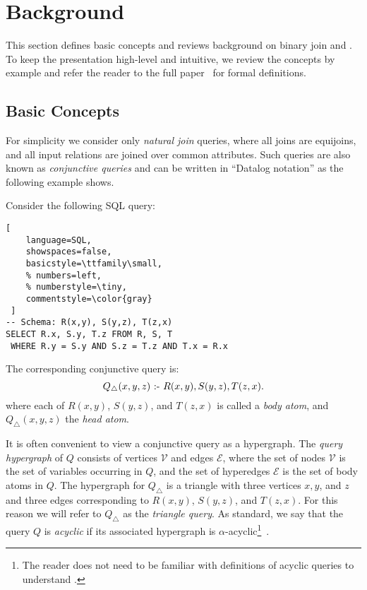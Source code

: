 \section{Background}\label{sec:background}

This section defines basic concepts and reviews background on binary
join and \GJ.
To keep the presentation high-level and intuitive,
we review the concepts by example
and refer the reader to the full paper~\cite{10.1145/3589295}
for formal definitions.

\subsection{Basic Concepts}\label{sec:basic-concepts}

For simplicity we consider only {\em natural join} queries,
where all joins are equijoins, and all input relations
are joined over common attributes.
Such queries are also known as {\em conjunctive queries}
and can be written in ``Datalog notation'' as the following
example shows.

\begin{example} \label{ex:triangle} Consider the following SQL query:
  \begin{lstlisting}[
    language=SQL,
    showspaces=false,
    basicstyle=\ttfamily\small,
    % numbers=left,
    % numberstyle=\tiny,
    commentstyle=\color{gray}
 ]
-- Schema: R(x,y), S(y,z), T(z,x)
SELECT R.x, S.y, T.z FROM R, S, T 
 WHERE R.y = S.y AND S.z = T.z AND T.x = R.x
\end{lstlisting}
  The corresponding conjunctive query is:
  $$Q_{\triangle}(x,y,z) \text{ :- } R(x, y), S(y,z), T(z, x).$$
  where each of $R(x, y)$, $S(y,z)$, and $T(z, x)$
  is called a {\em body atom}, and $Q_\triangle(x, y, z)$
  the {\em head atom}.
\end{example}

It is often convenient to view a conjunctive query as
a hypergraph.  The \emph{query hypergraph} of $Q$ consists of vertices
$\mathcal{V}$ and edges $\mathcal{E}$, where the set of nodes
$\mathcal{V}$ is the set of variables occurring in $Q$, and the set of
hyperedges $\mathcal{E}$ is the set of body atoms in $Q$.
The hypergraph for $Q_\triangle$ is a triangle with three
vertices $x, y$, and $z$ and three edges corresponding to
$R(x, y)$, $S(y,z)$, and $T(z, x)$.
For this reason we will refer to $Q_\triangle$ as the {\em triangle
    query}.
As standard, we
say that the query $Q$ is {\em acyclic} if its associated hypergraph
is $\alpha$-acyclic\footnote{The reader does not need to be familiar
  with definitions of acyclic queries to understand \FJ.}~\cite{DBLP:journals/jacm/Fagin83}.


